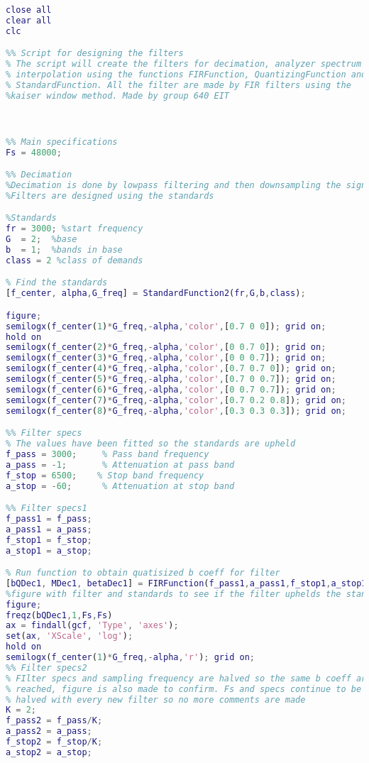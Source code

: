 \begin{lstlisting}[language=Matlab, caption = {Matlab script for designing FIR filters},label={ls:FIRMatlabScript}]
close all
clear all 
clc

%% Script for designing the filters
% The script will create the filters for decimation, analyzer spectrum and
% interpolation using the functions FIRFunction, QuantizingFunction and
% StandardFunction. All the filter are made by FIR filters using the 
%kaiser window method. Made by group 640 EIT



%% Main specifications 
Fs = 48000;

%% Decimation
%Decimation is done by lowpass filtering and then downsampling the signal
%Filters are designed using the standards

%Standards
fr = 3000; %start frequency
G  = 2;  %base
b  = 1;  %bands in base
class = 2 %class of demands

% Find the standards
[f_center, alpha,G_freq] = StandardFunction2(fr,G,b,class);

figure;
semilogx(f_center(1)*G_freq,-alpha,'color',[0.7 0 0]); grid on;
hold on 
semilogx(f_center(2)*G_freq,-alpha,'color',[0 0.7 0]); grid on;
semilogx(f_center(3)*G_freq,-alpha,'color',[0 0 0.7]); grid on;
semilogx(f_center(4)*G_freq,-alpha,'color',[0.7 0.7 0]); grid on;
semilogx(f_center(5)*G_freq,-alpha,'color',[0.7 0 0.7]); grid on;
semilogx(f_center(6)*G_freq,-alpha,'color',[0 0.7 0.7]); grid on;
semilogx(f_center(7)*G_freq,-alpha,'color',[0.7 0.2 0.8]); grid on;
semilogx(f_center(8)*G_freq,-alpha,'color',[0.3 0.3 0.3]); grid on;

%% Filter specs 
% The values have been fitted so the standards are upheld 
f_pass = 3000;     % Pass band frequency 
a_pass = -1;       % Attenuation at pass band 
f_stop = 6500;    % Stop band frequency
a_stop = -60;      % Attenuation at stop band

%% Filter specs1
f_pass1 = f_pass;
a_pass1 = a_pass;
f_stop1 = f_stop;
a_stop1 = a_stop;

% Run function to obtain quatisized b coeff for filter
[bQDec1, MDec1, betaDec1] = FIRFunction(f_pass1,a_pass1,f_stop1,a_stop1,Fs); 
%figure with filter and standards to see if the filter uphelds the standard
figure;
freqz(bQDec1,1,Fs,Fs)
ax = findall(gcf, 'Type', 'axes');
set(ax, 'XScale', 'log');
hold on 
semilogx(f_center(1)*G_freq,-alpha,'r'); grid on;
%% Filter specs2
% FIlter specs and sampling frequency are halved so the same b coeff are 
% reached, figure is also made to confirm. Fs and specs continue to be 
% halved with every new filter so no more comments are made
K = 2;
f_pass2 = f_pass/K;
a_pass2 = a_pass;
f_stop2 = f_stop/K;
a_stop2 = a_stop;


\end{lstlisting}
